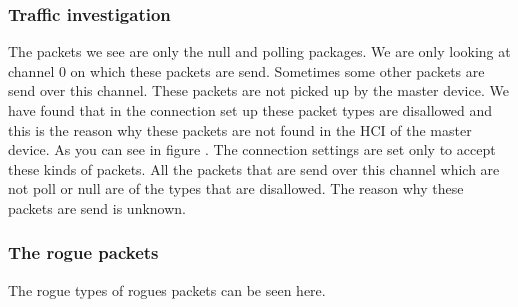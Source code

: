 \subsubsection{Traffic investigation}
The packets we see are only  the null and polling packages. We are only looking at channel 0  on which these packets are send. Sometimes some other packets are send over this channel. These packets are not picked up by the master device. We have found that in the connection set up these packet types are disallowed and this is the reason why these packets are not found in the HCI of the master device. As you can see in figure . The connection settings are set only to accept these kinds of packets. All the packets that are send over this channel which are not poll or null are of the types that are disallowed. \pend
The reason why these packets are send is unknown.
\subsubsection{The rogue packets}
The rogue types of rogues packets can be seen here.